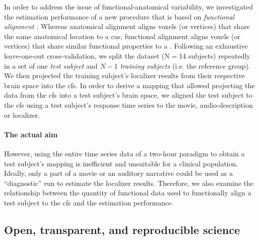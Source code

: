 
In order to address the issue of functional-anatomical variability, we
investigated the estimation performance of a new procedure that is based on
\textit{functional alignment} \citep[cf.][for reviews]{haxby2020hyperalignment,
bazeille2021empirical}.
%
Whereas anatomical alignment aligns voxels (or vertices) that share the same
anatomical location to a \ac{cas}, functional alignment aligns
voxels (or vertices) that share similar functional properties to a
.
%
Following an exhaustive leave-one-out cross-validation, we split the dataset
(N$=$14 subjects) repeatedly in a set of one \textit{test subject} and $N-1$
\textit{training subjects} (i.e.  the reference group).
%
%
We then projected the training subject's localizer results from their respective
brain space into the \ac{cfs}.
%
In order to derive a mapping that allowed projecting the data from the \ac{cfs}
into a test subject's brain space, we aligned the test subject to the \ac{cfs}
using a test subject's response time series to the movie, audio-description or
localizer.
%

\paragraph{The actual aim}



However, using the entire time series data of a two-hour paradigm to obtain
a test subject's mapping is inefficient and unsuitable for a clinical
population.
%
Ideally, only a part of a movie or an auditory narrative could be used as a
``diagnostic'' run to estimate the localizer results.
%
Therefore, we also examine the relationship between the quantity of functional
data used to functionally align a test subject to the \ac{cfs} and the
estimation performance.



\subsection{Open, transparent, and reproducible science}


